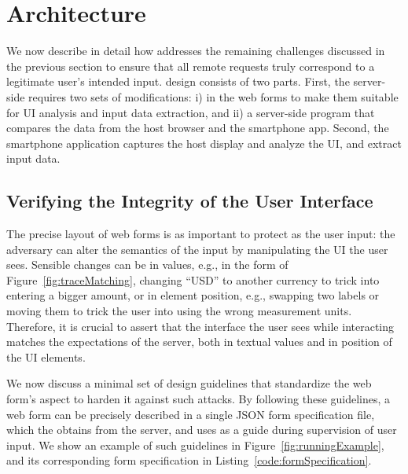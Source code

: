 \section{\sysname Architecture} \label{sec:hardenUI}

We now describe in detail how \sysname addresses the remaining challenges discussed in the previous section to ensure that all remote requests truly correspond to a legitimate user's intended input. \sysname design consists of two parts. First, the server-side requires two sets of modifications: i) in the web forms to make them suitable for UI analysis and input data extraction, and ii) a server-side program that compares the data from the host browser and the smartphone app. Second, the smartphone application captures the host display and analyze the UI, and extract input data.


\subsection{Verifying the Integrity of the User Interface}
\label{sec:systemDesign:webpage}

The precise layout of web forms is as important to protect as the user input: the adversary can alter the semantics of the input by manipulating the UI the user sees.
Sensible changes can be in values, e.g., in the form of Figure~\ref{fig:traceMatching}, changing ``USD'' to another currency to trick into entering a bigger amount, or in element position, e.g., swapping two labels or moving them to trick the user into using the wrong measurement units.
Therefore, it is crucial to assert that the interface the user sees while interacting matches the expectations of the server, both in textual values and in position of the UI elements.

We now discuss a minimal set of design guidelines that standardize the web form's aspect to harden it against such attacks.
By following these guidelines, a web form can be precisely described in a single JSON form specification file, which the \app obtains from the server, and uses as a guide during supervision of user input.
We show an example of such guidelines in Figure~\ref{fig:runningExample}, and its corresponding form specification in Listing~\ref{code:formSpecification}.



